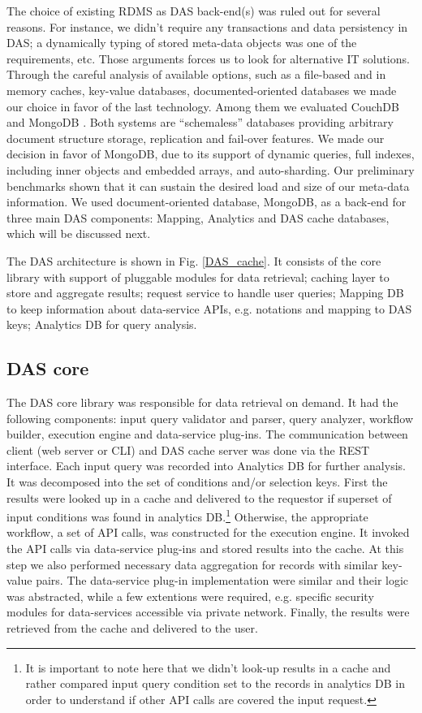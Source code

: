 \documentclass[1p,times]{elsarticle}
\begin{document}
\noindent
The choice of existing RDMS as DAS back-end(s) was ruled out for several reasons. 
For instance, we didn't require any transactions and data persistency in DAS;
a dynamically typing of stored meta-data objects was one of the requirements, etc.
Those arguments forces us to look for alternative IT solutions.
Through the careful analysis of available options, such as a file-based and in memory caches, 
key-value databases, documented-oriented databases we made our choice in favor 
of the last technology. Among them we evaluated CouchDB \cite{CouchDB} and 
MongoDB \cite{MongoDB}. Both systems are ``schemaless'' databases providing
arbitrary document structure storage, replication and fail-over features. 
We made our decision in favor of MongoDB, due to its support of dynamic queries, 
full indexes, including inner objects and embedded arrays,
and auto-sharding. Our preliminary benchmarks shown that it can sustain
the desired load and size of our meta-data information. We used 
document-oriented database, MongoDB, as a back-end for three 
main DAS components: Mapping, Analytics and DAS cache databases, 
which will be discussed next. 

The DAS architecture is shown in Fig. \ref{DAS_cache}. It consists of
the core library with support of pluggable modules for data retrieval;
caching layer to store and aggregate results;
request service to handle user queries;
Mapping DB to keep information about data-service APIs, e.g.
notations and mapping to DAS keys;
Analytics DB for query analysis.

\subsection{DAS core\label{DAS_core}}
The DAS core library was responsible for data retrieval on demand. 
It had the following components: input query validator and parser,
query analyzer, workflow builder, execution engine and data-service 
plug-ins. The communication between client (web server or CLI) and 
DAS cache server was done via the REST \cite{REST} interface. 
Each input query was recorded into Analytics DB for further 
analysis. It was decomposed into the set of conditions and/or selection keys.
First the results were looked up in a cache and delivered to the requestor
if superset of input conditions was found in analytics DB.\footnote{It is important
to note here that we didn't look-up results in a cache and rather
compared input query condition set to the records in analytics DB 
in order to understand if other API calls are covered the input request.}
Otherwise, the appropriate workflow, a set of API calls, was constructed
for the execution engine. It invoked the API calls via data-service
plug-ins and stored results into the cache. At this step we also
performed necessary data aggregation for records with similar key-value
pairs. The data-service plug-in implementation were similar and their 
logic was abstracted, while a few extentions were required, e.g. specific 
security modules for data-services accessible via private network.
Finally, the results were retrieved from the cache and delivered to the user. 
\end{document}

